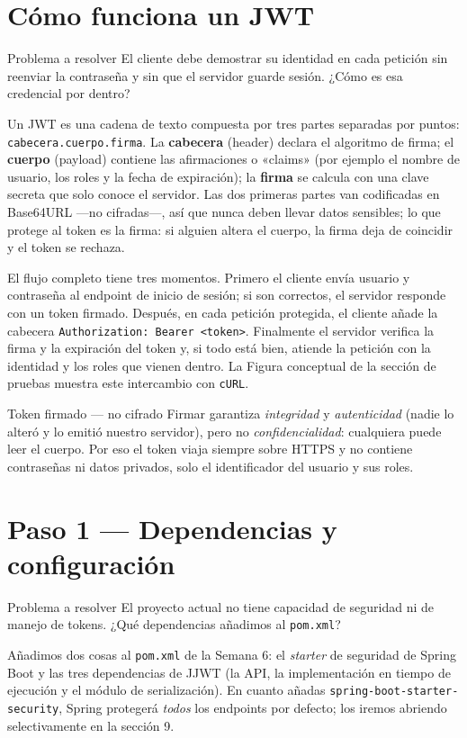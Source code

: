 \documentclass[11pt]{article}
\begin{document}
\section{Cómo funciona un JWT}
\begin{cajaproblema}{Problema a resolver}
El cliente debe demostrar su identidad en cada petición sin reenviar la contraseña y sin que el servidor guarde sesión. ¿Cómo es esa credencial por dentro?\par
\end{cajaproblema}
Un JWT es una cadena de texto compuesta por tres partes separadas por puntos: \texttt{cabecera.\allowbreak{}cuerpo.\allowbreak{}firma}. La \textbf{cabecera} (header) declara el algoritmo de firma; el \textbf{cuerpo} (payload) contiene las afirmaciones o «claims» (por ejemplo el nombre de usuario, los roles y la fecha de expiración); la \textbf{firma} se calcula con una clave secreta que solo conoce el servidor. Las dos primeras partes van codificadas en Base64URL ---no cifradas---, así que nunca deben llevar datos sensibles; lo que protege al token es la firma: si alguien altera el cuerpo, la firma deja de coincidir y el token se rechaza.

El flujo completo tiene tres momentos. Primero el cliente envía usuario y contraseña al endpoint de inicio de sesión; si son correctos, el servidor responde con un token firmado. Después, en cada petición protegida, el cliente añade la cabecera \texttt{Authorization:\allowbreak{} Bearer\allowbreak{} <token>}. Finalmente el servidor verifica la firma y la expiración del token y, si todo está bien, atiende la petición con la identidad y los roles que vienen dentro. La Figura conceptual de la sección de pruebas muestra este intercambio con \texttt{cURL}.

\begin{cajatip}{Token firmado --- no cifrado}
Firmar garantiza \emph{integridad} y \emph{autenticidad} (nadie lo alteró y lo emitió nuestro servidor), pero no \emph{confidencialidad}: cualquiera puede leer el cuerpo. Por eso el token viaja siempre sobre HTTPS y no contiene contraseñas ni datos privados, solo el identificador del usuario y sus roles.\par
\end{cajatip}

\section{Paso 1 --- Dependencias y configuración}
\begin{cajaproblema}{Problema a resolver}
El proyecto actual no tiene capacidad de seguridad ni de manejo de tokens. ¿Qué dependencias añadimos al \texttt{pom.xml}?\par
\end{cajaproblema}
Añadimos dos cosas al \texttt{pom.xml} de la Semana 6: el \emph{starter} de seguridad de Spring Boot y las tres dependencias de JJWT (la API, la implementación en tiempo de ejecución y el módulo de serialización). En cuanto añadas \texttt{spring-boot-starter-security}, Spring protegerá \emph{todos} los endpoints por defecto; los iremos abriendo selectivamente en la sección 9.
\end{document}
